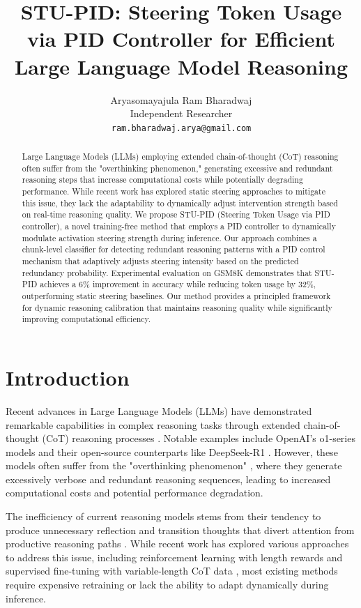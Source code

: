 \documentclass{article}
\title{STU-PID: Steering Token Usage via PID Controller for Efficient Large Language Model Reasoning}
\author{Aryasomayajula Ram Bharadwaj\\
Independent Researcher\\
\texttt{ram.bharadwaj.arya@gmail.com}}
\date{}
\begin{document}
\maketitle

\begin{abstract}
Large Language Models (LLMs) employing extended chain-of-thought (CoT) reasoning often suffer from the "overthinking phenomenon," generating excessive and redundant reasoning steps that increase computational costs while potentially degrading performance. While recent work has explored static steering approaches to mitigate this issue, they lack the adaptability to dynamically adjust intervention strength based on real-time reasoning quality. We propose STU-PID (Steering Token Usage via PID controller), a novel training-free method that employs a PID controller to dynamically modulate activation steering strength during inference. Our approach combines a chunk-level classifier for detecting redundant reasoning patterns with a PID control mechanism that adaptively adjusts steering intensity based on the predicted redundancy probability. Experimental evaluation on GSM8K demonstrates that STU-PID achieves a 6\% improvement in accuracy while reducing token usage by 32\%, outperforming static steering baselines. Our method provides a principled framework for dynamic reasoning calibration that maintains reasoning quality while significantly improving computational efficiency.
\end{abstract}

\section{Introduction}

Recent advances in Large Language Models (LLMs) have demonstrated remarkable capabilities in complex reasoning tasks through extended chain-of-thought (CoT) reasoning processes \cite{wei2022chain}. Notable examples include OpenAI's o1-series models and their open-source counterparts like DeepSeek-R1 \cite{guo2025deepseek}. However, these models often suffer from the "overthinking phenomenon" \cite{sui2025stop}, where they generate excessively verbose and redundant reasoning sequences, leading to increased computational costs and potential performance degradation.

The inefficiency of current reasoning models stems from their tendency to produce unnecessary reflection and transition thoughts that divert attention from productive reasoning paths \cite{chen2025seal}. While recent work has explored various approaches to address this issue, including reinforcement learning with length rewards and supervised fine-tuning with variable-length CoT data \cite{sui2025stop}, most existing methods require expensive retraining or lack the ability to adapt dynamically during inference.
\end{document}
